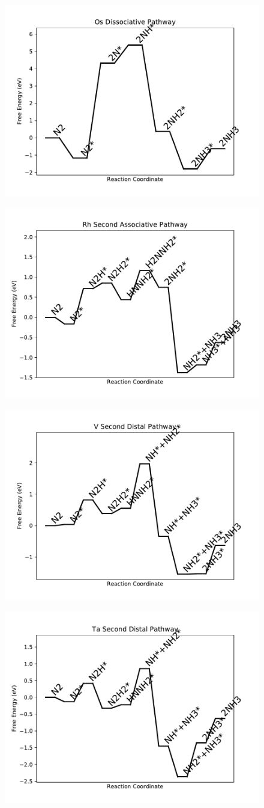 \documentclass[journal=jacsat,manuscript=article]{achemso}
\begin{document}
\begin{figure}
\includegraphics[width=0.5\linewidth]{data/plots/Os_dissociative.pdf}
\label{fig:Os_dissociative}
\end{figure}

\newpage
\begin{figure}
\includegraphics[width=0.5\linewidth]{data/plots/Rh_associative_2.pdf}
\label{fig:Rh_associative_2}
\end{figure}

\begin{figure}
\includegraphics[width=0.5\linewidth]{data/plots/V_distal_2.pdf}
\label{fig:V_distal_2}
\end{figure}

\newpage
\begin{figure}
\includegraphics[width=0.5\linewidth]{data/plots/Ta_distal_2.pdf}
\label{fig:Ta_distal_2}
\end{figure}
\end{document}
